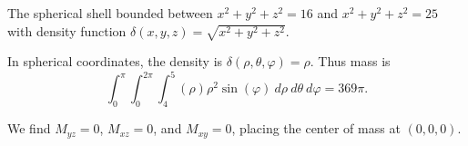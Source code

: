 {
The spherical shell bounded between $x^2+y^2+z^2=16$ and $x^2+y^2+z^2=25$ with density function $\delta(x,y,z) = \sqrt{x^2+y^2+z^2}$.
}
{In spherical coordinates, the density is $\delta(\rho,\theta,\varphi) = \rho$. Thus mass is
$$\int_0^{\pi}\int_0^{2\pi}\int_{4}^{5} (\rho)\rho^2\sin(\varphi)\ d\rho\ d\theta\ d\varphi = 369\pi.$$

We find $M_{yz} = 0$, $M_{xz} = 0$, and $M_{xy} = 0$, placing the center of mass at $(0,0,0)$.
}
